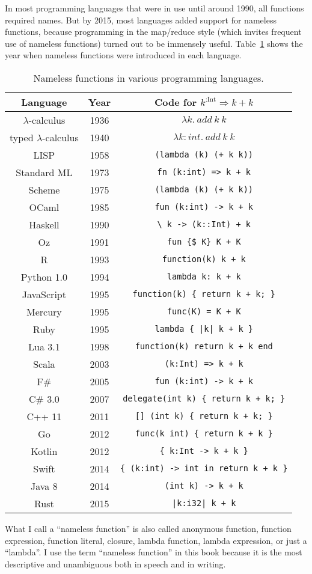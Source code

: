 In most programming languages that were in use until around 1990,
all functions required names. But by 2015, most languages added support
for nameless functions, because programming in the map/reduce style
(which invites frequent use of nameless functions) turned out to be
immensely useful. Table\ \ref{lambda-functions-table} shows the
year when nameless functions were introduced in each language.

\begin{table}
\begin{centering}
\begin{tabular}{|c|c|c|}
\hline 
\textbf{Language } & \textbf{Year} & \textbf{Code for }$k^{:\text{Int}}\Rightarrow k+k$\tabularnewline
\hline 
\hline 
$\lambda$-calculus & 1936 & $\lambda k.~add~k~k$\tabularnewline
\hline 
typed $\lambda$-calculus & 1940 & $\lambda k:int.~add~k~k$\tabularnewline
\hline 
LISP & 1958 & \texttt{\footnotesize{}(lambda (k) (+ k k))}\tabularnewline
\hline 
Standard ML & 1973 & \texttt{\footnotesize{}fn (k:int) => k + k}\tabularnewline
\hline 
Scheme & 1975 & \texttt{\footnotesize{}(lambda (k) (+ k k))}\tabularnewline
\hline 
OCaml & 1985 & \texttt{\footnotesize{}fun (k:int) -> k + k}\tabularnewline
\hline 
Haskell  & 1990 & \texttt{\footnotesize{}\textbackslash{} k -> (k::Int) + k}\tabularnewline
\hline 
Oz & 1991 & \texttt{\footnotesize{}fun \{\$ K\} K + K}\tabularnewline
\hline 
R  & 1993 & \texttt{\footnotesize{}function(k) k + k}\tabularnewline
\hline 
Python 1.0 & 1994 & \texttt{\footnotesize{}lambda k: k + k}\tabularnewline
\hline 
JavaScript  & 1995 & \texttt{\footnotesize{}function(k) \{ return k + k; \}}\tabularnewline
\hline 
Mercury  & 1995 & \texttt{\footnotesize{}func(K) = K + K}\tabularnewline
\hline 
Ruby  & 1995 & \texttt{\footnotesize{}lambda \{ |k| k + k \}}\tabularnewline
\hline 
Lua 3.1 & 1998 & \texttt{\footnotesize{}function(k) return k + k end}\tabularnewline
\hline 
Scala  & 2003 & \texttt{\footnotesize{}(k:Int) => k + k}\tabularnewline
\hline 
F\# & 2005 & \texttt{\footnotesize{}fun (k:int) -> k + k}\tabularnewline
\hline 
C\# 3.0 & 2007 & \texttt{\footnotesize{}delegate(int k) \{ return k + k; \}}\tabularnewline
\hline 
C++ 11 & 2011 & \texttt{\footnotesize{}{[}{]} (int k) \{ return k + k; \}}\tabularnewline
\hline 
Go & 2012 & \texttt{\footnotesize{}func(k int) \{ return k + k \}}\tabularnewline
\hline 
Kotlin & 2012 & \texttt{\footnotesize{}\{ k:Int -> k + k \}}\tabularnewline
\hline 
Swift  & 2014 & \texttt{\footnotesize{}\{ (k:int) -> int in return k + k \}}\tabularnewline
\hline 
Java 8 & 2014 & \texttt{\footnotesize{}(int k) -> k + k}\tabularnewline
\hline 
Rust & 2015 & \texttt{\footnotesize{}|k:i32| k + k}\tabularnewline
\hline 
\end{tabular}
\par\end{centering}
\caption{Nameless functions in various programming languages.}
\label{lambda-functions-table}
\end{table}

What I call a ``nameless function'' is also called anonymous function,
function expression, function literal, closure, lambda function, lambda
expression, or just a ``lambda''. I use the term ``nameless function''
in this book because it is the most descriptive and unambiguous both
in speech and in writing.
